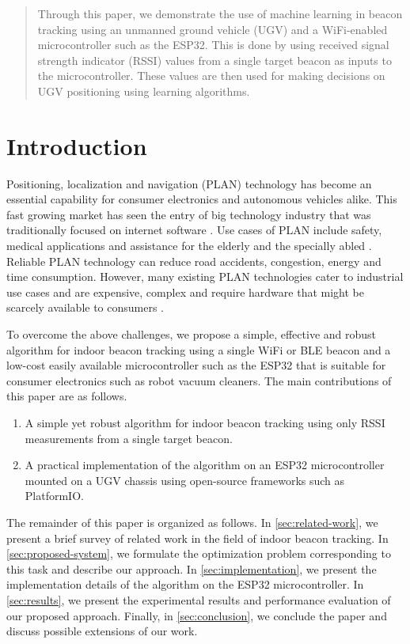 \documentclass[conference]{IEEEtran}
\begin{document}
\begin{abstract}
    Through this paper, we demonstrate the use of machine learning in
    beacon tracking using an unmanned ground vehicle (UGV) and a WiFi-enabled
    microcontroller such as the ESP32.
    This is done by using received signal strength indicator (RSSI) values from a single target beacon as inputs to the microcontroller. These values are then used for making decisions on UGV positioning using learning algorithms. 
\end{abstract}

\section{Introduction}
\label{sec:intro}
Positioning, localization and navigation (PLAN) technology has become an
essential capability for consumer electronics and autonomous vehicles alike.
This fast growing market has seen the entry of big technology industry that was traditionally focused on internet software \cite{}.  
Use cases of PLAN include safety, medical applications and
assistance for the elderly and the specially abled \cite{}. Reliable PLAN technology can
reduce road accidents, congestion, energy and time consumption. However, many
existing PLAN technologies cater to industrial use cases and are expensive,
complex and require hardware that might be scarcely available to consumers \cite{}. 

To overcome the above challenges, we propose a simple, effective and robust
algorithm for indoor beacon tracking using a single WiFi or BLE beacon and a
low-cost easily available microcontroller such as the ESP32 that is suitable for
consumer electronics such as robot vacuum cleaners. The main contributions of
this paper are as follows.

\begin{enumerate}
    \item A simple yet robust algorithm for indoor beacon tracking using only
    RSSI measurements from a single target beacon.
    \item A practical implementation of the algorithm on an ESP32
    microcontroller mounted on a UGV chassis using open-source frameworks such
    as PlatformIO.
\end{enumerate}

The remainder of this paper is organized as follows. In
\autoref{sec:related-work}, we present a brief survey of related work in the
field of indoor beacon tracking. In \autoref{sec:proposed-system}, we formulate
the optimization problem corresponding to this task and describe our approach.
In \autoref{sec:implementation}, we present the implementation details of the
algorithm on the ESP32 microcontroller. In \autoref{sec:results}, we present the
experimental results and performance evaluation of our proposed approach.
Finally, in \autoref{sec:conclusion}, we conclude the paper and discuss possible
extensions of our work.
\end{document}
